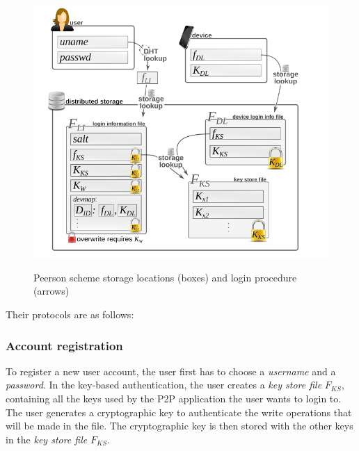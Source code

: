 \begin{figure}
\center
\includegraphics[width=12cm]{../img/password_peerson}\\
\caption{Peerson scheme storage locations (boxes) and login procedure (arrows) }
\label{fig:p2p_peerson}
\end{figure}

Their protocols are as follows:
%
\subsubsection{Account registration}

To register a new user account, the user first
has to choose a \textit{username} and a \textit{password}.
In the key-based authentication, the user creates a \textit{key store
file} $F_{KS}$, containing all the
keys used by the P2P application the user wants to login to.
The user generates a cryptographic key to authenticate the write operations
that will be made in the file. The cryptographic key is then stored with the
other keys in the \textit{key store file} $F_{KS}$.

